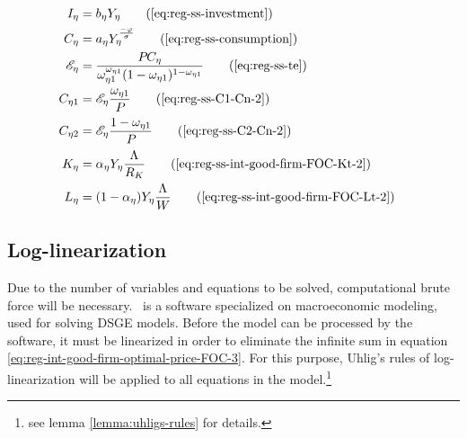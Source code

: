 \documentclass[
thesis.tex
]{subfiles}
\begin{document}
\begin{align}
		\\
		I_{\eta} &= b_{\eta} Y_{\eta} \tag{\ref{eq:reg-ss-investment}}
		\\
		C_{\eta} &= a_{\eta} Y_{\eta}^{\frac{-\varphi}{\sigma}} \tag{\ref{eq:reg-ss-consumption}}
		\\
		\te[] &= \frac{P_{} C_{\eta}}{\omega_{\eta 1}^{\omega_{\eta 1}} (1 -\omega_{\eta 1})^{1 -\omega_{\eta 1}}} \tag{\ref{eq:reg-ss-te}}
		\\
		C_{\eta 1} &= \te[] \frac{\omega_{\eta 1}}{P_{}} \tag{\ref{eq:reg-ss-C1-Cn-2}}
		\\
		C_{\eta 2} &= \te[] \frac{1 -\omega_{\eta 1}}{P_{}} \tag{\ref{eq:reg-ss-C2-Cn-2}}
		\\
		K_{\eta} &= {\alpha_{\eta}} Y_{\eta} \frac{\Lambda_{}}{R_K} \tag{\ref{eq:reg-ss-int-good-firm-FOC-Kt-2}}
		\\
		L_{\eta} &= (1-{\alpha_{\eta}}) Y_{\eta} \frac{\Lambda_{}}{W} \tag{\ref{eq:reg-ss-int-good-firm-FOC-Lt-2}}
	\end{align}

		\begin{comment}
			Y_{1} &= \left[ \left( \frac{a_{1}}{1 - b_{1}} \right) \left( \frac{1}{\omega_{11}^{\omega_{11}} (1 - \omega_{11})^{1 - \omega_{11}}} \right) \right]^{\frac{\sigma}{\sigma + \varphi}} \tag{\ref{eq:reg-ss-total-y1}}
			\\
			Y_{2} &= \left[ \left( \frac{a_{2}}{1 - b_{2}} \right) \left( \frac{1}{\omega_{21}^{\omega_{21}} (1 - \omega_{21})^{1 - \omega_{21}}} \right) \right]^{\frac{\sigma}{\sigma + \varphi}} \tag{\ref{eq:reg-ss-total-y2}}
			\\
		\end{comment}

	\newpage
	
	
\subsection{Log-linearization}
	
	Due to the number of variables and equations to be solved, computational brute force will be necessary. \dynare \ is a software specialized on macroeconomic modeling, used for solving DSGE models. Before the model can be processed by the software, it must be linearized in order to eliminate the infinite sum in equation \ref{eq:reg-int-good-firm-optimal-price-FOC-3}. For this purpose, Uhlig's rules of log-linearization \cite{uhlig_toolkit_1999} will be applied to all equations in the model.\footnote{see lemma \ref{lemma:uhligs-rules} for details.}
\end{document}
